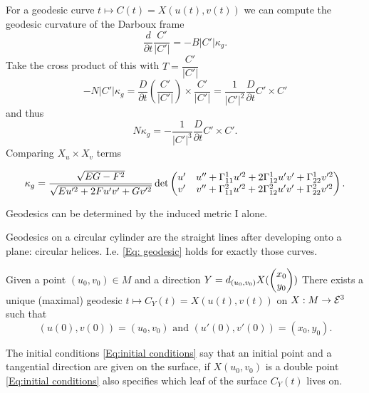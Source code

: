 \begin{remark}
	
	For a geodesic curve $ t \mapsto C(t) = X(u(t),v(t)) $ we can compute the geodesic curvature of the Darboux frame
		\[ \dfrac{d}{\partial t} \dfrac{C'}{|C'|} = - B |C'|\kappa_g. \]
	Take the cross product of this with $ T = \dfrac{C'}{|C'|} $
		\[ - N |C'|\kappa_g = \dfrac{D}{\partial t}(\dfrac{C'}{|C'|}) \times \dfrac{C'}{|C'|} = \dfrac{1}{|C'|^2} \dfrac{D}{\partial t}C' \times C' \] and thus
		\[ N\kappa_g = - \dfrac{1}{|C'|^3}\dfrac{D}{\partial t} C' \times C'. \]
		Comparing $ X_u \times X_v $ terms
		
		\[ \kappa_g = \frac {\sqrt{EG-F^2}}{\sqrt{Eu'^2+2Fu'v'+Gv'^2}} \det \begin{pmatrix} 
			u' & u'' + \Gamma_{11}^1 u'^2 + 2\Gamma_{12}^1u'v' + \Gamma_{22}^1v'^2\\
			v' & v'' + \Gamma_{11}^2 u'^2 + 2\Gamma_{12}^2u'v' + \Gamma_{22}^2v'^2 \end{pmatrix}.
		\]
		
	
\end{remark}

\begin{corollary}
	Geodesics can be determined by the induced metric $ \mathrm{I} $ alone.
\end{corollary}

\begin{example}
	
	Geodesics on a circular cylinder are the straight lines after developing onto a plane: circular helices.
	I.e. \ref*{Eq: geodesic} holds for exactly those curves.
	
\end{example}

\begin{corollary}
	
	Given a point $ (u_0,v_0) \in M $ and a direction $ Y = d_{(u_0,v_0)}X(\begin{pmatrix} x_0 \\ y_0 \end{pmatrix})  $
	There exists a unique (maximal) geodesic $ t \mapsto C_Y(t) = X(u(t),v(t)) $ on $ X: M \rightarrow \mathcal E^3 $ such that
		\[ (u(0),v(0)) = (u_0,v_0) \text{ and } (u'(0),v'(0)) = (x_0,y_0) \label{Eq:initial conditions}. \]
	
\end{corollary}

\begin{remark}
	
	The initial conditions \ref*{Eq:initial conditions} say that an initial point and a tangential direction are given on the surface, if $ X(u_0,v_0) $ is a double point \ref*{Eq:initial conditions} also specifies which leaf of the surface $ C_Y(t) $ lives on.
	
\end{remark}

